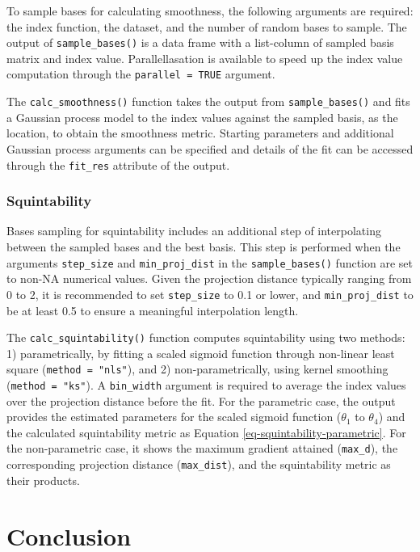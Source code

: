 \documentclass[
  12pt,
]{interact}
\theoremstyle{plain}
\begin{document}
To sample bases for calculating smoothness, the following arguments are
required: the index function, the dataset, and the number of random
bases to sample. The output of \texttt{sample\_bases()} is a data frame
with a list-column of sampled basis matrix and index value.
Parallellasation is available to speed up the index value computation
through the \texttt{parallel\ =\ TRUE} argument.

The \texttt{calc\_smoothness()} function takes the output from
\texttt{sample\_bases()} and fits a Gaussian process model to the index
values against the sampled basis, as the location, to obtain the
smoothness metric. Starting parameters and additional Gaussian process
arguments can be specified and details of the fit can be accessed
through the \texttt{fit\_res} attribute of the output.

\subsubsection{Squintability}\label{squintability}

Bases sampling for squintability includes an additional step of
interpolating between the sampled bases and the best basis. This step is
performed when the arguments \texttt{step\_size} and
\texttt{min\_proj\_dist} in the \texttt{sample\_bases()} function are
set to non-NA numerical values. Given the projection distance typically
ranging from 0 to 2, it is recommended to set \texttt{step\_size} to 0.1
or lower, and \texttt{min\_proj\_dist} to be at least 0.5 to ensure a
meaningful interpolation length.

The \texttt{calc\_squintability()} function computes squintability using
two methods: 1) parametrically, by fitting a scaled sigmoid function
through non-linear least square (\texttt{method\ =\ "nls"}), and 2)
non-parametrically, using kernel smoothing (\texttt{method\ =\ "ks"}). A
\texttt{bin\_width} argument is required to average the index values
over the projection distance before the fit. For the parametric case,
the output provides the estimated parameters for the scaled sigmoid
function (\(\theta_1\) to \(\theta_4\)) and the calculated squintability
metric as Equation \ref{eq-squintability-parametric}. For the
non-parametric case, it shows the maximum gradient attained
(\texttt{max\_d}), the corresponding projection distance
(\texttt{max\_dist}), and the squintability metric as their products.

\section{Conclusion}\label{sec-conclusion}
\end{document}
